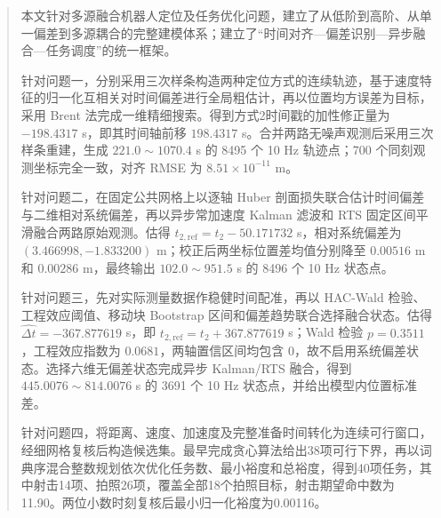 \begin{abstract}
本文针对多源融合机器人定位及任务优化问题，建立了从低阶到高阶、从单一偏差到多源耦合的完整建模体系；建立了“时间对齐—偏差识别—异步融合—任务调度”的统一框架。

针对问题一，分别采用三次样条构造两种定位方式的连续轨迹，基于速度特征的归一化互相关对时间偏差进行全局粗估计，再以位置均方误差为目标，采用 Brent 法完成一维精细搜索。得到方式2时间戳的加性修正量为 $-198.4317$ s，即其时间轴前移 $198.4317$ s。合并两路无噪声观测后采用三次样条重建，生成 $221.0\sim1070.4$ s 的 8495 个 10 Hz 轨迹点；700 个同刻观测坐标完全一致，对齐 RMSE 为 $8.51\times10^{-11}$ m。

针对问题二，在固定公共网格上以逐轴 Huber 剖面损失联合估计时间偏差与二维相对系统偏差，再以异步常加速度 Kalman 滤波和 RTS 固定区间平滑融合两路原始观测。估得 $t_{2,\mathrm{ref}}=t_2-50.171732$ s，相对系统偏差为 $(3.466998,-1.833200)$ m；校正后两坐标位置差均值分别降至 $0.00516$ m 和 $0.00286$ m，最终输出 $102.0\sim951.5$ s 的 8496 个 10 Hz 状态点。

针对问题三，先对实际测量数据作稳健时间配准，再以 HAC-Wald 检验、工程效应阈值、移动块 Bootstrap 区间和偏差趋势联合选择融合状态。估得 $\widehat{\Delta t}=-367.877619$ s，即 $t_{2,\mathrm{ref}}=t_2+367.877619$ s；Wald 检验 $p=0.3511$，工程效应指数为 $0.0681$，两轴置信区间均包含 0，故不启用系统偏差状态。选择六维无偏差状态完成异步 Kalman/RTS 融合，得到 $445.0076\sim814.0076$ s 的 3691 个 10 Hz 状态点，并给出模型内位置标准差。

针对问题四，将距离、速度、加速度及完整准备时间转化为连续可行窗口，经细网格复核后构造候选集。最早完成贪心算法给出38项可行下界，再以词典序混合整数规划依次优化任务数、最小裕度和总裕度，得到40项任务，其中射击14项、拍照26项，覆盖全部18个拍照目标，射击期望命中数为11.90。两位小数时刻复核后最小归一化裕度为0.00116。

\end{abstract}
